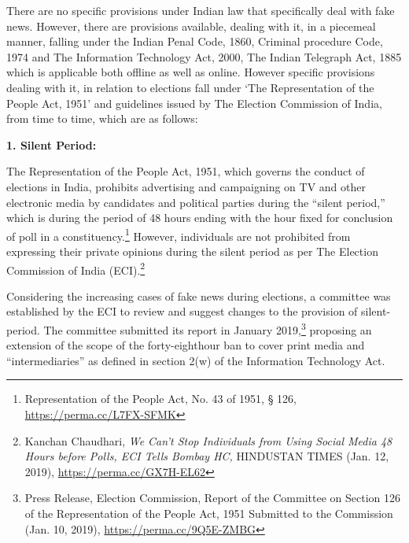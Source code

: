 \begin{multicols}{2}
\vspace{-.15cm}


\vspace{-.15cm}

\noi
There are no specific provisions under Indian law that specifically deal with fake news.
However, there are provisions available, dealing with it, in a piecemeal manner, falling under
the Indian Penal Code, 1860, Criminal procedure Code, 1974 and The Information
Technology Act, 2000, The Indian Telegraph Act, 1885 which is applicable both offline as
well as online. However specific provisions dealing with it, in relation to elections fall under
‘The Representation of the People Act, 1951’ and guidelines issued by The Election
Commission of India, from time to time, which are as follows:

\vspace{-.15cm}
\noi
{\large\bfseries 1. Silent Period:}

\vspace{-.15cm}

\noi
The Representation of the People Act, 1951, which governs the conduct of elections in India,
prohibits advertising and campaigning on TV and other electronic media by candidates and
political parties during the “silent period,” which is during the period of 48 hours ending with
the hour fixed for conclusion of poll in a constituency.\footnote{Representation of the People Act, No. 43 of 1951, § 126, \url{https://perma.cc/L7FX-SFMK}} However, individuals are not
prohibited from expressing their private opinions during the silent period as per The Election
Commission of India (ECI).\footnote{Kanchan Chaudhari, \textit{We Can’t Stop Individuals from Using Social Media 48 Hours before Polls, ECI Tells
Bombay HC,} HINDUSTAN TIMES (Jan. 12, 2019), \url{https://perma.cc/GX7H-EL62}}

\noi
Considering the increasing cases of fake news during elections, a committee was established
by the ECI to review and suggest changes to the provision of silent-period. The committee
submitted its report in January 2019,\footnote{Press Release, Election Commission, Report of the Committee on Section 126 of the Representation of the
People Act, 1951 Submitted to the Commission (Jan. 10, 2019), \url{https://perma.cc/9Q5E-ZMBG}} proposing an extension of the scope of the forty-eighthour 
ban to cover print media and “intermediaries” as defined in section 2(w) of the Information Technology Act.


\end{multicols}
